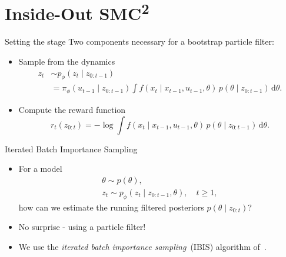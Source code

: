 \documentclass[10pt, aspectratio=1610]{beamer}
\newcommand{\dd}{\mathrm{d}}
\begin{document}
  \section{Inside-Out \texorpdfstring{SMC\textsuperscript{2}}{SMC2}}
    \begin{frame}{Setting the stage}
      Two components necessary for a bootstrap particle filter:
      \begin{itemize}[<+->]
        \item Sample from the dynamics
          \begin{align}
            z_t &\sim p_\phi(z_t \mid z_{0:t-1}) \\
            &= \pi_\phi(u_{t-1} \mid z_{0:t-1}) \int f(x_t \mid x_{t-1}, u_{t-1}, \theta) \, p(\theta \mid z_{0:t-1}) \, \dd \theta.
          \end{align}
        \item Compute the reward function
          \begin{equation}
            r_t(z_{0:t}) = - \log \int f(x_t \mid x_{t-1}, u_{t-1}, \theta) \, p(\theta \mid z_{0:t-1}) \, \dd \theta.
          \end{equation}
      \end{itemize}
    \end{frame}

    \begin{frame}{Iterated Batch Importance Sampling}
      \begin{itemize}[<+->]
        \setlength\itemsep{1.5em}
        \item For a model
          \begin{gather}
            \theta \sim p(\theta), \\
            z_t \sim p_\phi(z_t \mid z_{0:t-1}, \theta), \quad t \geq 1,
          \end{gather}
          how can we estimate the running filtered posteriors $p(\theta \mid z_{0:t})$?
        \item No surprise - using a particle filter!
        \item We use the \emph{iterated batch importance sampling}~(IBIS) algorithm of~\citet{chopin2002sequential}.
      \end{itemize}
    \end{frame}
\end{document}
